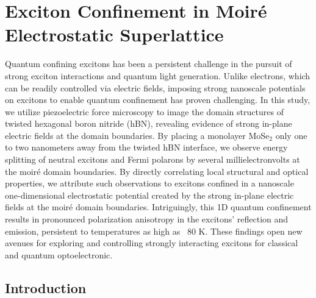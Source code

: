 
\renewcommand{\thechapter}{4}

\chapter{Exciton Confinement in Moiré Electrostatic Superlattice}
\label{chap4}

Quantum confining excitons has been a persistent challenge in the pursuit of strong exciton interactions and quantum light generation. Unlike electrons, which can be readily controlled via electric fields, imposing strong nanoscale potentials on excitons to enable quantum confinement has proven challenging. 
In this study, we utilize piezoelectric force microscopy to image the domain structures of twisted hexagonal boron nitride (hBN), revealing evidence of strong 
in-plane electric fields at the domain boundaries. 
By placing a monolayer MoSe$_2$ only one to two nanometers away from the twisted hBN interface, we observe energy splitting of neutral excitons and Fermi polarons by several millielectronvolts at the moiré domain boundaries. 
By directly correlating local structural and optical properties, we attribute such observations to excitons confined in a nanoscale one-dimensional electrostatic potential created by the strong in-plane electric fields at the moiré domain boundaries.
Intriguingly, this 1D quantum confinement results in pronounced polarization anisotropy in the excitons’ reflection and emission, persistent to temperatures as high as ~80 K. 
These findings open new avenues for exploring and controlling strongly interacting excitons for classical and quantum optoelectronic.

\section{Introduction}

